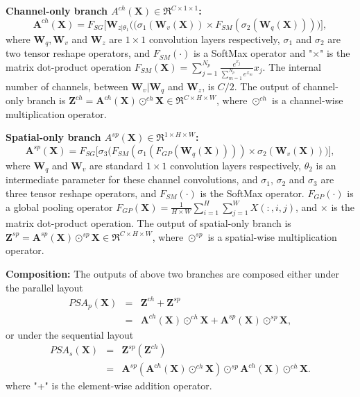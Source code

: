\documentclass[10pt,twocolumn,letterpaper]{article}
\newcommand{\X}{\mathbf{X}}
\newcommand{\Z}{\mathbf{Z}}
\newcommand{\A}{\mathbf{A}}
\newcommand{\W}{\mathbf{W}}
\begin{document}
\textbf{Channel-only branch $A^{ch}(\X)\in\Re^{C\times 1 \times 1}$:}  
\begin{equation}
    \A^{ch}(\X)= F_{SG}\Big[\W_{z|\theta_1}\Big((\sigma_1(\W_{v}(\X)) \times F_{SM}(\sigma_2(\W_{q}(\X)))\Big)\Big],
    \label{eqn:CHA}
\end{equation}
where $\W_{q}, \W_{v}$ and $\W_{z}$ are $1\times 1$ convolution layers respectively, $\sigma_1$ and $\sigma_2$ are two tensor reshape operators, and $F_{SM}(\cdot)$ is a SoftMax operator and "$\times$" is the matrix dot-product operation $F_{SM}(\X)= \sum_{j=1}^{N_p}{\frac{e^{x_j}}{\sum_{m=1}^{N_p}{e^{x_m}}}{x_j}}$. The internal number of channels, between $\W_{v}|\W_{q}$ and $\W_{z}$, is $C/2$. The output of channel-only branch is $\Z^{ch}=\A^{ch}(\X) \odot^{ch} \X \in \Re^{C\times H \times W}$, where $\odot^{ch}$ is a channel-wise multiplication operator. 

 \textbf{Spatial-only branch $A^{sp}(\X)\in\Re^{1\times H \times W}$:}  
\begin{equation}
    \A^{sp}(\X)= F_{SG}\Big[\sigma_3\Big(
    F_{SM}(\sigma_1(F_{GP}(\W_{q}(\X)))) 
    \times 
    \sigma_2(\W_{v}(\X))
    \Big)\Big],
    \label{eqn:SPA}
\end{equation}
where $\W_{q}$ and $\W_{v}$ are standard $1\times 1$ convolution layers respectively, $\theta_2$ is an intermediate parameter for these channel convolutions, and $\sigma_1$, $\sigma_2$ and $\sigma_3$ are three tensor reshape operators, and $F_{SM}(\cdot)$ is the SoftMax operator. $F_{GP}(\cdot)$ is a global pooling operator $ F_{GP}(\X)= \frac{1}{H\times W} \sum_{i=1}^{H} \sum_{j=1}^{W} X(:,i,j)$, and $\times$ is the matrix dot-product operation. The output of spatial-only branch is $\Z^{sp}=\A^{sp}(\X) \odot^{sp} \X \in \Re^{C\times H \times W}$, where $\odot^{sp}$ is a spatial-wise multiplication operator. 

\textbf{Composition:} The outputs of above two branches are composed either under the parallel layout
\begin{eqnarray}
  PSA_p(\X)&=&  \Z^{ch}+\Z^{sp}\\
\nonumber &=&\A^{ch}(\X) \odot^{ch} \X + \A^{sp}(\X) \odot^{sp} \X,
\label{eqn:PSA_p}
\end{eqnarray}
or under the sequential layout
\begin{eqnarray}
 PSA_s(\X)&=& \Z^{sp}(\Z^{ch})\\
\nonumber &=& \A^{sp}(\A^{ch}(\X) \odot^{ch} \X) \odot^{sp} \A^{ch}(\X) \odot^{ch} \X.
\label{eqn:PSA_s}
\end{eqnarray}
where "+" is the element-wise addition operator.
\end{document}
